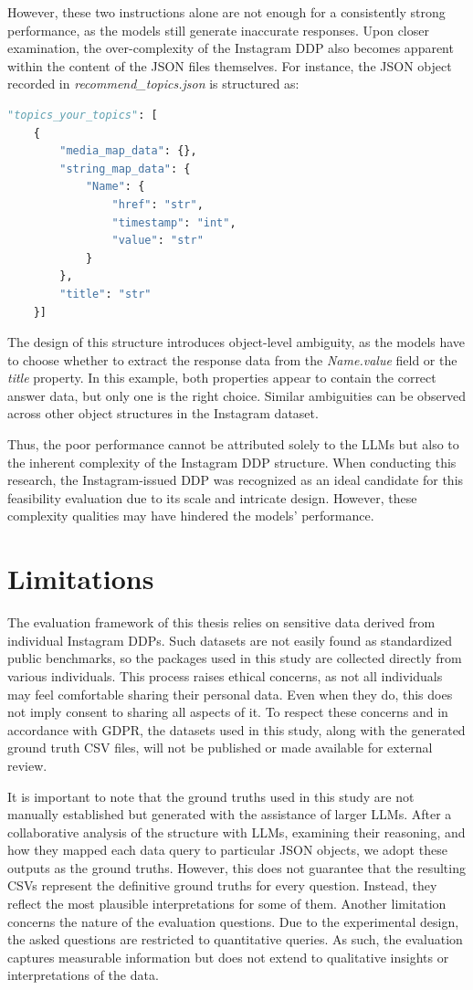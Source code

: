 \documentclass{DESSThesis}
\begin{document}
However, these two instructions alone are not enough for a consistently strong performance, as the models still generate inaccurate responses. Upon closer examination, the over-complexity of the Instagram DDP also becomes apparent within the content of the JSON files themselves. For instance, the JSON object recorded in \emph{recommend\_topics.json} is structured as:
\begin{lstlisting}[language=Python]
"topics_your_topics": [
    {
        "media_map_data": {},
        "string_map_data": {
            "Name": {
                "href": "str",
                "timestamp": "int",
                "value": "str"
            }
        },
        "title": "str"
    }]
\end{lstlisting}
The design of this structure introduces object-level ambiguity, as the models have to choose whether to extract the response data from the \emph{Name.value} field or the \emph{title} property. In this example, both properties appear to contain the correct answer data, but only one is the right choice. Similar ambiguities can be observed across other object structures in the Instagram dataset.

Thus, the poor performance cannot be attributed solely to the LLMs but also to the inherent complexity of the Instagram DDP structure. When conducting this research, the Instagram-issued DDP was recognized as an ideal candidate for this feasibility evaluation due to its scale and intricate design. However, these complexity qualities may have hindered the models' performance. 

\section{Limitations}

The evaluation framework of this thesis relies on sensitive data derived from individual Instagram DDPs. Such datasets are not easily found as standardized public benchmarks, so the packages used in this study are collected directly from various individuals. This process raises ethical concerns, as not all individuals may feel comfortable sharing their personal data. Even when they do, this does not imply consent to sharing all aspects of it. To respect these concerns and in accordance with GDPR, the datasets used in this study, along with the generated ground truth CSV files, will not be published or made available for external review.

It is important to note that the ground truths used in this study are not manually established but generated with the assistance of larger LLMs. After a collaborative analysis of the structure with LLMs, examining their reasoning, and how they mapped each data query to particular JSON objects, we adopt these outputs as the ground truths. However, this does not guarantee that the resulting CSVs represent the definitive ground truths for every question. Instead, they reflect the most plausible interpretations for some of them. Another limitation concerns the nature of the evaluation questions. Due to the experimental design, the asked questions are restricted to quantitative queries. As such, the evaluation captures measurable information but does not extend to qualitative insights or interpretations of the data.
\end{document}
